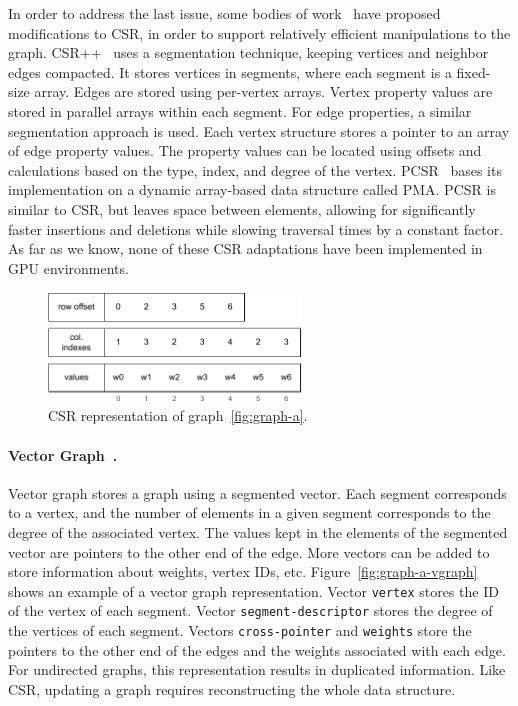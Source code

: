     In order to address the last issue, some bodies of work~\cite{paper:pcsr, paper:csrpp} have proposed modifications to \gls{CSR}, in order to support relatively efficient manipulations to the graph. CSR++~\cite{paper:csrpp} uses a segmentation technique, keeping vertices and neighbor edges compacted. It stores vertices in segments, where each segment is a fixed-size array. Edges are stored using per-vertex arrays. Vertex property values are stored in parallel arrays within each segment. For edge properties, a similar segmentation approach is used. Each vertex structure stores a pointer to an array of edge property values. The property values can be located using offsets and calculations based on the type, index, and degree of the vertex. \gls{PCSR}~\cite{paper:pcsr} bases its implementation on a dynamic array-based data structure called \gls{PMA}. \gls{PCSR} is similar to \gls{CSR}, but leaves space between elements, allowing for significantly faster insertions and deletions while slowing traversal times by a constant factor. As far as we know, none of these \gls{CSR} adaptations have been implemented in GPU environments.

\begin{figure}[tbp]
  \centering
    \includegraphics[width=0.6\textwidth]{Chapters/Figures/Images/graph_a_csr.pdf}
    \caption{\gls{CSR} representation of graph~\ref{fig:graph-a}.}
\label{fig:graph-a-csr}
\end{figure}

    \paragraph{\textbf{Vector Graph}~\cite{vgraph}.} Vector graph stores a graph using a segmented vector. Each segment corresponds to a vertex, and the number of elements in a given segment corresponds to the degree of the associated vertex. The values kept in the elements of the segmented vector are pointers to the other end of the edge. More vectors can be added to store information about weights, vertex IDs, etc. Figure~\ref{fig:graph-a-vgraph} shows an example of a vector graph representation. Vector \texttt{vertex} stores the ID of the vertex of each segment. Vector \texttt{segment-descriptor} stores the degree of the vertices of each segment. Vectors \texttt{cross-pointer} and \texttt{weights} store the pointers to the other end of the edges and the weights associated with each edge. For undirected graphs, this representation results in duplicated information. Like \gls{CSR}, updating a graph requires reconstructing the whole data structure. %
    

